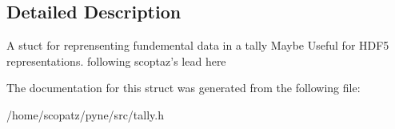 \subsection{Detailed Description}
A stuct for reprensenting fundemental data in a tally Maybe Useful for H\-D\-F5 representations. following scoptaz's lead here 

The documentation for this struct was generated from the following file\-:\begin{DoxyCompactItemize}
\item 
/home/scopatz/pyne/src/tally.\-h\end{DoxyCompactItemize}
